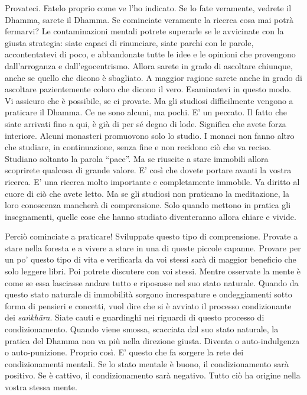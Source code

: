 Provateci. Fatelo proprio come ve l'ho indicato. Se lo fate veramente,
vedrete il Dhamma, sarete il Dhamma. Se cominciate veramente la ricerca
cosa mai potrà fermarvi? Le contaminazioni mentali potrete superarle se
le avvicinate con la giusta strategia: siate capaci di rinunciare, siate
parchi con le parole, accontentatevi di poco, e abbandonate tutte le
idee e le opinioni che provengono dall'arroganza e dall'egocentrismo.
Allora sarete in grado di ascoltare chiunque, anche se quello che dicono
è sbagliato. A maggior ragione sarete anche in grado di ascoltare
pazientemente coloro che dicono il vero. Esaminatevi in questo modo. Vi
assicuro che è possibile, se ci provate. Ma gli studiosi difficilmente
vengono a praticare il Dhamma. Ce ne sono alcuni, ma pochi. E' un
peccato. Il fatto che siate arrivati fino a qui, è già di per sé degno
di lode. Significa che avete forza interiore. Alcuni monasteri
promuovono solo lo studio. I monaci non fanno altro che studiare, in
continuazione, senza fine e non recidono ciò che va reciso. Studiano
soltanto la parola ``pace''. Ma se riuscite a stare immobili allora
scoprirete qualcosa di grande valore. E' così che dovete portare avanti
la vostra ricerca. E' una ricerca molto importante e completamente
immobile. Va diritto al cuore di ciò che avete letto. Ma se gli studiosi
non praticano la meditazione, la loro conoscenza mancherà di
comprensione. Solo quando mettono in pratica gli insegnamenti, quelle
cose che hanno studiato diventeranno allora chiare e vivide.

Perciò cominciate a praticare! Sviluppate questo tipo di comprensione.
Provate a stare nella foresta e a vivere a stare in una di queste
piccole capanne. Provare per un po' questo tipo di vita e verificarla da
voi stessi sarà di maggior beneficio che solo leggere libri. Poi potrete
discutere con voi stessi. Mentre osservate la mente è come se essa
lasciasse andare tutto e riposasse nel suo stato naturale. Quando da
questo stato naturale di immobilità sorgono increspature e ondeggiamenti
sotto forma di pensieri e concetti, vuol dire che si è avviato il
processo condizionante dei \emph{saṅkhāra}. Siate cauti e guardinghi nei
riguardi di questo processo di condizionamento. Quando viene smossa,
scacciata dal suo stato naturale, la pratica del Dhamma non va più nella
direzione giusta. Diventa o auto-indulgenza o auto-punizione. Proprio
così. E' questo che fa sorgere la rete dei condizionamenti mentali. Se
lo stato mentale è buono, il condizionamento sarà positivo. Se è
cattivo, il condizionamento sarà negativo. Tutto ciò ha origine nella
vostra stessa mente.

